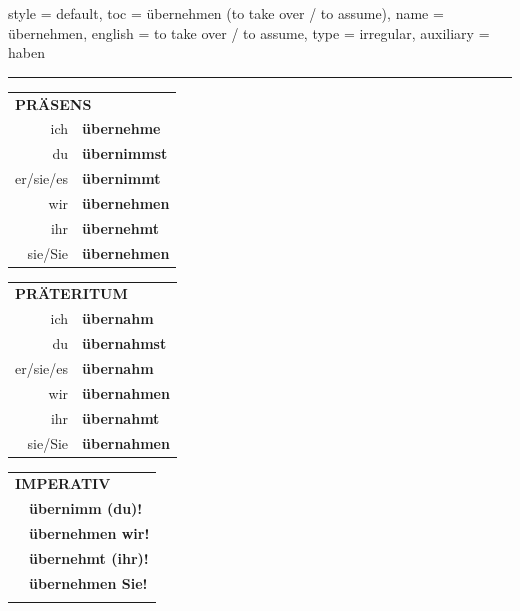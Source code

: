 \begin{verbentry}{
  style = {default},
  toc = {übernehmen (to take over / to assume)},
  name = {übernehmen},
  english = {to take over / to assume},
  type = {irregular},
  auxiliary = {haben}
}
 
    
     \vspace{5pt}

    \hrule
    
    \vspace{5pt}

  \begin{tabular}{rl}
     \multicolumn{2}{l}{\textbf{PRÄSENS} }\\
    ich & \textbf{übernehme}\\
    du & \textbf{übernimmst}\\
    er/sie/es & \textbf{übernimmt}\\
    wir & \textbf{übernehmen}\\
    ihr & \textbf{übernehmt}\\
    sie/Sie & \textbf{übernehmen}\\
  \end{tabular}
  \hfill
     \begin{tabular}{rl}
    \multicolumn{2}{l}{\textbf{PRÄTERITUM} }\\
    ich & \textbf{übernahm}\\
    du & \textbf{übernahmst}\\
    er/sie/es & \textbf{übernahm}\\
    wir & \textbf{übernahmen}\\
    ihr & \textbf{übernahmt}\\
    sie/Sie & \textbf{übernahmen}\\
  \end{tabular}
  \hfill
  \begin{tabular}{rl}
     \multicolumn{2}{l}{\textbf{IMPERATIV} }\\
   & \textbf{übernimm (du)!}\\
   & \textbf{übernehmen wir!}\\
   & \textbf{übernehmt (ihr)!}\\
   & \textbf{übernehmen Sie!}\\
   & \vspace{10pt}
  \end{tabular}

    \vspace{10pt}


\end{verbentry}
